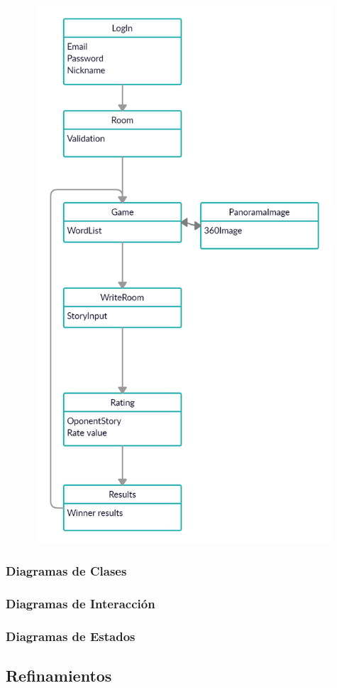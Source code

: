 \documentclass[12pt]{article}
\begin{document}
\includegraphics[width=16cm, height=20cm]{imgs/ModeloSoftwareInicial.jpg}
\subsubsection{Diagramas de Clases}
\subsubsection{Diagramas de Interacción}
\subsubsection{Diagramas de Estados}

\subsection{Refinamientos}
\end{document}
